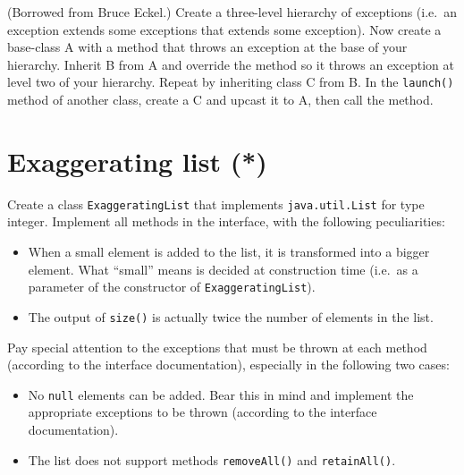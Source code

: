 \documentclass{article}
\begin{document}
(Borrowed from Bruce Eckel.) Create a three-level hierarchy of
exceptions (i.e.~an exception extends some exceptions that extends
some exception). Now create a base-class A with a method that throws an
exception at the base of your hierarchy. Inherit B from A and override
the method so it throws an exception at level two of your
hierarchy. Repeat by inheriting class C from B. In the \verb+launch()+
method of another class, create a C
and upcast it to A, then call the method.

\section{Exaggerating list (*)}
\label{sec:exaggerating-list}

Create a class \verb+ExaggeratingList+ that implements 
\verb+java.util.List+ for type integer. 
Implement all methods in the interface, with
the following peculiarities: 

\begin{itemize}
\item When a small element is added to the list, it is transformed
  into a bigger element. What ``small'' means is decided at
  construction time (i.e.~as a parameter of the constructor of
  \verb+ExaggeratingList+).
\item The output of \verb+size()+ is actually twice the number of
  elements in the list.
\end{itemize}

Pay special attention to the exceptions that must be thrown at each
method (according to the interface documentation), especially in the
following two cases:

\begin{itemize}
\item No \verb+null+ elements can be added. Bear this in mind and
  implement the appropriate exceptions to be thrown (according to the
  interface documentation).
\item The list does not support methods \verb+removeAll()+ and
  \verb+retainAll()+. 
\end{itemize}
\end{document}
